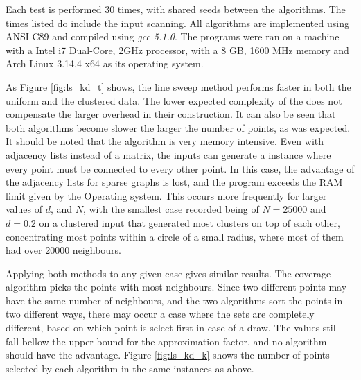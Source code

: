 Each test is performed 30 times, with shared seeds between the algorithms. The times listed do include the input scanning. All algorithms are implemented using ANSI C89 and compiled using \emph{gcc 5.1.0}. The programs were ran on a machine with a Intel i7 Dual-Core, 2GHz processor, with a 8 GB, 1600 MHz memory and Arch Linux 3.14.4 x64 as its operating system.



As Figure \ref{fig:ls_kd_t} shows, the line sweep method performs faster in both the uniform and the clustered data. The lower expected complexity of the \kdtrees does not compensate the larger overhead in their construction. It can also be seen that both algorithms become slower the larger the number of points, as was expected. It should be noted that the algorithm is very memory intensive. Even with adjacency lists instead of a matrix, the inputs can generate a instance where every point must be connected to every other point. In this case, the advantage of the adjacency lists for sparse graphs is lost, and the program exceeds the RAM limit given by the Operating system. This occurs more frequently for larger values of $d$, and $N$, with the smallest case recorded being of $N=25000$ and $d=0.2$ on a clustered input that generated most clusters on top of each other, concentrating most points within a circle of a small radius, where most of them had over 20000 neighbours. 

Applying both methods to any given case gives similar results. The coverage algorithm picks the points with most neighbours. Since two different points may have the same number of neighbours, and the two algorithms sort the points in two different ways, there may occur a case where the sets are completely different, based on which point is select first in case of a draw. The values still fall bellow the upper bound for the approximation factor, and no algorithm should have the advantage. Figure \ref{fig:ls_kd_k} shows the number of points selected by each algorithm in the same instances as above.




